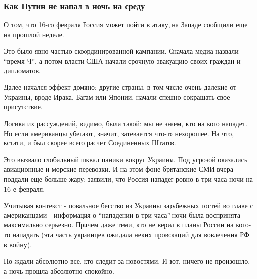  
 
 
 
 

\subsubsection{Как Путин не напал в ночь на среду}
\label{sec:16_02_2022.stz.news.ua.strana.3.putin_ne_napal_infvojna.1.kak_putin_ne_napal_v_noch_na_sredu}

О том, что 16-го февраля Россия может пойти в атаку, на Западе сообщили еще на
прошлой неделе.

Это было явно частью скоординированной кампании. Сначала медиа назвали \enquote{время
Ч}, а потом власти США начали срочную эвакуацию своих граждан и дипломатов. 

Далее начался эффект домино: другие страны, в том числе очень далекие от
Украины, вроде Ирака, Багам или Японии, начали спешно сокращать свое
присутствие.

Логика их рассуждений, видимо, была такой: мы не знаем, кто на кого нападет. Но
если американцы убегают, значит, затевается что-то нехорошее. На что, кстати, и
был скорее всего расчет Соединенных Штатов. 

Это вызвало глобальный шквал паники вокруг Украины. Под угрозой оказались
авиационные и морские перевозки. И на этом фоне британские СМИ вчера поддали
еще больше жару: заявили, что Россия нападет ровно в три часа ночи на 16-е
февраля. 

Учитывая контекст - повальное бегство из Украины зарубежных гостей во главе с
американцами - информация о \enquote{нападении в три часа} ночи была воспринята
максимально серьезно. Причем даже теми, кто не верил в планы России на кого-то
нападать (эта часть украинцев ожидала неких провокаций для вовлечения РФ в
войну). 

Но ждали абсолютно все, кто следит за новостями. И вот, ничего не произошло, а
ночь прошла абсолютно спокойно. 

